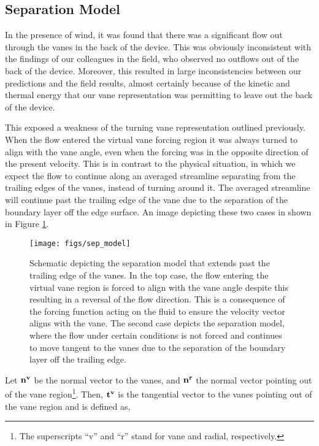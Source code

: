 \subsection{Separation Model}

In the presence of wind, it was found that there was a significant flow
out through the vanes in the back of the device. This was obviously
inconsistent with the findings of our colleagues in the field, who
observed no outflows out of the back of the device. Moreover, this resulted
in large inconsistencies between our predictions and the field results,
almost certainly because of the kinetic and thermal energy that our vane
representation was permitting to leave out the back of the device.  

This exposed a weakness of the turning vane representation outlined
previously. When the flow entered the virtual vane forcing region it was
always turned to align with the vane angle, even when the forcing was in
the opposite direction of the present velocity.
This is in contrast to the physical situation, in which we
expect the flow to continue along an averaged streamline separating from the 
trailing edges of the vanes, instead of turning around it. 
The averaged streamline will continue past the trailing edge of the vane
due to the separation of the boundary layer off the edge surface. An
image depicting these two cases in shown in Figure \ref{fig:sep_model}.  

\begin{figure}[!htb]
  \begin{center}
    \texttt{[image: figs/sep\_model]}
    \caption{Schematic depicting the separation model that extends past
   the trailing edge of the vanes. In the top case, the flow entering
   the virtual vane region is forced to align with the vane angle despite
   this resulting in a reversal of the flow direction. This is a
   consequence of the forcing function acting on the fluid to ensure the
   velocity vector aligns with the vane. 
   The second case depicts the separation
   model, where the flow under certain conditions is not forced and
   continues to move tangent to the vanes due to 
   the separation of the boundary layer off the trailing edge.} 
    \label{fig:sep_model}
  \end{center}
\end{figure}

Let $\bf n^v$ be the normal vector to the vanes,
and $\bf n^r$ the normal vector pointing out of the vane
region\footnote{\normalsize The superscripts ``v'' and ``r'' stand for
vane and radial, respectively.}.  
Then, $\bf t^v$ is the tangential vector to the vanes pointing out of
the vane region and is defined as,

